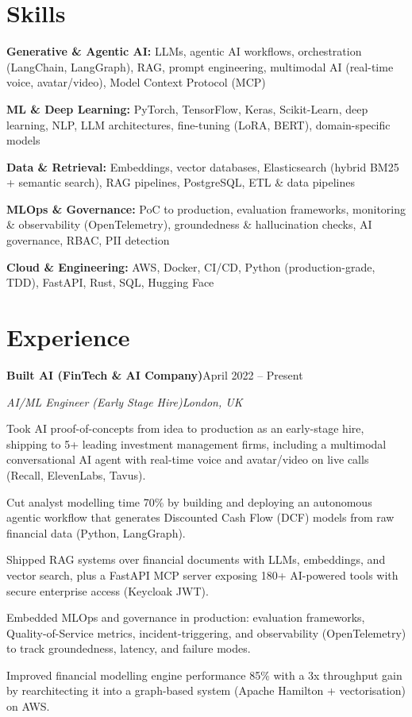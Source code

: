 \documentclass[10pt,a4paper]{article}
\newcommand{\entry}[4]{%
  {\color{company}\bfseries #1}\hfill {\color{muted}#2}\par
  \vspace{1pt}
  {\itshape #3}\hfill {\color{muted}\itshape #4}\par
  \vspace{3pt}%
}
\begin{document}
\section{Skills}
\begin{tight}
  \item[\textcolor{accent}{\small$\bullet$}] \textbf{Generative \& Agentic AI:} LLMs, agentic AI workflows, orchestration (LangChain, LangGraph), RAG, prompt engineering, multimodal AI (real-time voice, avatar/video), Model Context Protocol (MCP)
  \item[\textcolor{accent}{\small$\bullet$}] \textbf{ML \& Deep Learning:} PyTorch, TensorFlow, Keras, Scikit-Learn, deep learning, NLP, LLM architectures, fine-tuning (LoRA, BERT), domain-specific models
  \item[\textcolor{accent}{\small$\bullet$}] \textbf{Data \& Retrieval:} Embeddings, vector databases, Elasticsearch (hybrid BM25 + semantic search), RAG pipelines, PostgreSQL, ETL \& data pipelines
  \item[\textcolor{accent}{\small$\bullet$}] \textbf{MLOps \& Governance:} PoC to production, evaluation frameworks, monitoring \& observability (OpenTelemetry), groundedness \& hallucination checks, AI governance, RBAC, PII detection
  \item[\textcolor{accent}{\small$\bullet$}] \textbf{Cloud \& Engineering:} AWS, Docker, CI/CD, Python (production-grade, TDD), FastAPI, Rust, SQL, Hugging Face
\end{tight}

\section{Experience}
\entry{Built AI (FinTech \& AI Company)}{April 2022 -- Present}{AI/ML Engineer (Early Stage Hire)}{London, UK}
\begin{tight}
  \item Took AI proof-of-concepts from idea to production as an early-stage hire, shipping to 5+ leading investment management firms, including a multimodal conversational AI agent with real-time voice and avatar/video on live calls (Recall, ElevenLabs, Tavus).
  \item Cut analyst modelling time 70\% by building and deploying an autonomous agentic workflow that generates Discounted Cash Flow (DCF) models from raw financial data (Python, LangGraph).
  \item Shipped RAG systems over financial documents with LLMs, embeddings, and vector search, plus a FastAPI MCP server exposing 180+ AI-powered tools with secure enterprise access (Keycloak JWT).
  \item Embedded MLOps and governance in production: evaluation frameworks, Quality-of-Service metrics, incident-triggering, and observability (OpenTelemetry) to track groundedness, latency, and failure modes.
  \item Improved financial modelling engine performance 85\% with a 3x throughput gain by rearchitecting it into a graph-based system (Apache Hamilton + vectorisation) on AWS.
\end{tight}
\end{document}
